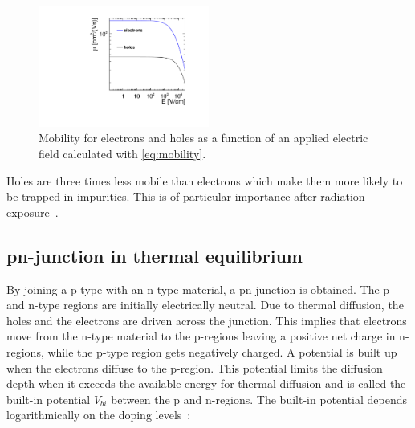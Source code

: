 \begin{figure}[htbp]
  \centering
  \includegraphics[width=0.5\textwidth]{figures/ChargeSharing/Mobility_electron_holes.pdf}
  \caption{Mobility for electrons and holes as a function of an
    applied electric field calculated with \cref{eq:mobility}.}
  \label{fig:Mobility_electron_holes}
\end{figure}


Holes are three times less mobile than electrons which make them more
likely to be trapped in impurities. This is of particular importance
after radiation exposure~\cite{Rossi:976471}.



\subsection{pn-junction in thermal equilibrium}

By joining a p-type with an n-type material, a pn-junction is
obtained. The p and n-type regions are initially electrically
neutral. Due to thermal diffusion, the holes and the electrons are
driven across the junction. This implies that electrons move from the
n-type material to the p-regions leaving a positive net charge in
n-regions, while the p-type region gets negatively charged. A
potential is built up when the electrons diffuse to the p-region. This
potential limits the diffusion depth when it exceeds the available
energy for thermal diffusion and is called the built-in potential
$V_{bi}$ between the p and n-regions. The built-in potential depends
logarithmically on the doping levels~\cite{Spieler2005}:

